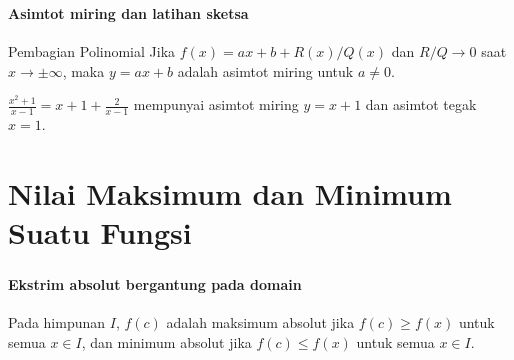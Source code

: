 \documentclass{../../kalkulus-ppt}
\begin{document}
\begin{frame}
\frametitle{\insertsection}
\framesubtitle{Asimtot miring dan latihan sketsa}

\begin{block}{Pembagian Polinomial}
Jika $f(x)=ax+b+R(x)/Q(x)$ dan $R/Q\to0$ saat $x\to\pm\infty$, maka $y=ax+b$ adalah asimtot miring untuk $a\ne0$.
\end{block}
\begin{contoh}
$\displaystyle\frac{x^2+1}{x-1}=x+1+\frac2{x-1}$ mempunyai asimtot miring $y=x+1$ dan asimtot tegak $x=1$.
\end{contoh}
\end{frame}

\section{Nilai Maksimum dan Minimum Suatu Fungsi}

\begin{frame}
\frametitle{\insertsection}
\framesubtitle{Ekstrim absolut bergantung pada domain}

\begin{definisi}
Pada himpunan $I$, $f(c)$ adalah maksimum absolut jika $f(c)\ge f(x)$ untuk semua $x\in I$, dan minimum absolut jika $f(c)\le f(x)$ untuk semua $x\in I$.
\end{definisi}
\end{frame}
\end{document}
